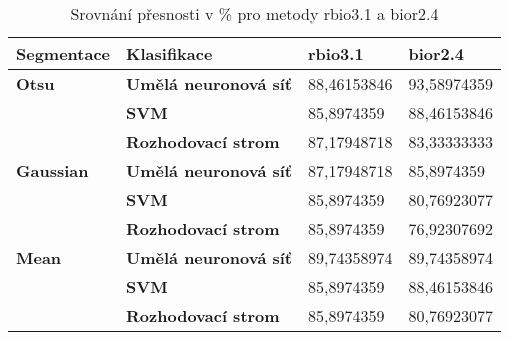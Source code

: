 \capstartfalse
\begin{table}[!htbp]
\begin{tabular}{|l|l|l|l|}
\hline
\textbf{Segmentace} & \textbf{Klasifikace}         & \textbf{rbio3.1} & \textbf{bior2.4} \\ \hline
\textbf{Otsu}       & \textbf{Umělá neuronová síť} & 88,46153846      & 93,58974359      \\ \hline
\textbf{}           & \textbf{SVM}                 & 85,8974359       & 88,46153846      \\ \hline
\textbf{}           & \textbf{Rozhodovací strom}   & 87,17948718      & 83,33333333      \\ \hline
\textbf{Gaussian}   & \textbf{Umělá neuronová síť} & 87,17948718      & 85,8974359       \\ \hline
\textbf{}           & \textbf{SVM}                 & 85,8974359       & 80,76923077      \\ \hline
\textbf{}           & \textbf{Rozhodovací strom}   & 85,8974359       & 76,92307692      \\ \hline
\textbf{Mean}       & \textbf{Umělá neuronová síť} & 89,74358974      & 89,74358974      \\ \hline
\textbf{}           & \textbf{SVM}                 & 85,8974359       & 88,46153846      \\ \hline
\textbf{}           & \textbf{Rozhodovací strom}   & 85,8974359       & 80,76923077      \\ \hline
\end{tabular}
\caption{Srovnání přesnosti v \% pro metody rbio3.1 a bior2.4 }
\end{table}
\capstarttrue






